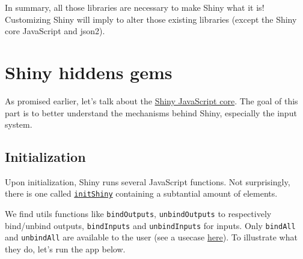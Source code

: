 \documentclass[]{book}
\newenvironment{Shaded}{\begin{snugshade}}{\end{snugshade}}
\newcommand{\ControlFlowTok}[1]{\textcolor[rgb]{0.13,0.29,0.53}{\textbf{#1}}}
\newcommand{\DataTypeTok}[1]{\textcolor[rgb]{0.13,0.29,0.53}{#1}}
\newcommand{\DecValTok}[1]{\textcolor[rgb]{0.00,0.00,0.81}{#1}}
\newcommand{\KeywordTok}[1]{\textcolor[rgb]{0.13,0.29,0.53}{\textbf{#1}}}
\newcommand{\NormalTok}[1]{#1}
\newcommand{\OperatorTok}[1]{\textcolor[rgb]{0.81,0.36,0.00}{\textbf{#1}}}
\newcommand{\StringTok}[1]{\textcolor[rgb]{0.31,0.60,0.02}{#1}}
\begin{document}
In summary, all those libraries are necessary to make Shiny what it is! Customizing Shiny will imply to alter those existing libraries (except the Shiny core JavaScript and json2).

\hypertarget{shiny-hiddens-gems}{%
\section{Shiny hiddens gems}\label{shiny-hiddens-gems}}

As promised earlier, let's talk about the \href{https://github.com/rstudio/shiny/blob/master/srcjs/init_shiny.js}{Shiny JavaScript core}. The goal of this part is to better understand the mechanisms behind Shiny, especially the input system.

\hypertarget{initialization}{%
\subsection{Initialization}\label{initialization}}

Upon initialization, Shiny runs several JavaScript functions. Not surprisingly, there is one called \href{https://github.com/rstudio/shiny/blob/master/srcjs/init_shiny.js}{\texttt{initShiny}} containing a subtantial amount of elements.

We find utils functions like \texttt{bindOutputs}, \texttt{unbindOutputs} to respectively bind/unbind outputs, \texttt{bindInputs} and \texttt{unbindInputs} for inputs. Only \texttt{bindAll} and \texttt{unbindAll} are available to the user (see a usecase \href{https://stackoverflow.com/questions/51633326/dateinput-not-working-on-dt-in-shiny}{here}). To illustrate what they do, let's run the app below.

\begin{Shaded}
\end{Shaded}
\end{document}
